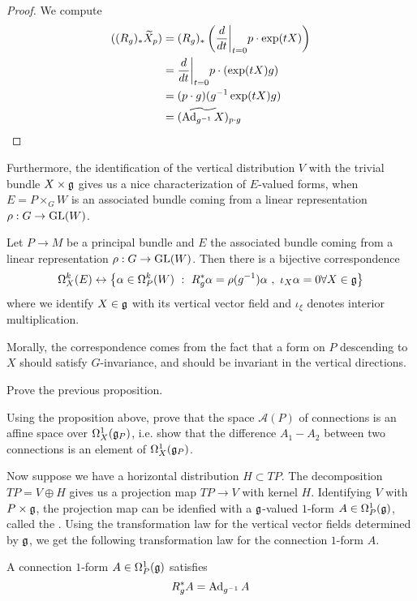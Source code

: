 %
\begin{proof}
We compute
\begin{align*}
((R_g)_*\widetilde{X}_p)
&= (R_g)_*\left(\frac{d}{dt}\bigg\vert_{t=0}p\cdot\exp(tX)\right) \\
&= \frac{d}{dt}\bigg\vert_{t=0}p\cdot(\exp(tX)g) \\
&= (p\cdot g)(g^{-1}\exp(tX)g) \\
&= (\widetilde{\operatorname{Ad}_{g^{-1}}X})_{p\cdot g}
\end{align*}
\end{proof}
%
Furthermore, the identification of the vertical distribution $V$ with the trivial
bundle $X \times \mathfrak{g}$ gives us a nice characterization of $E$-valued forms,
when $E = P\times_G W$ is an associated bundle coming from a linear representation
$\rho : G \to \mathrm{GL}(W)$.
%
\begin{prop}
Let $P \to M$ be a principal bundle and $E$ the associated bundle coming from
a linear representation $\rho : G \to \mathrm{GL}(W)$. Then there is a bijective
correspondence
\[
\Omega^k_X(E) \leftrightarrow \left\lbrace \alpha \in \Omega^k_P(W) ~:~ R^*_g\alpha =
\rho(g^{-1})\alpha~,~ \iota_X\alpha = 0 \forall X \in \mathfrak{g} \right\rbrace
\]
where we identify $X \in \mathfrak{g}$ with its vertical vector field and
$\iota_\xi$ denotes interior multiplication.
\end{prop}
%
Morally, the correspondence comes from the fact that a form on $P$ descending
to $X$ should satisfy $G$-invariance, and should be invariant in the vertical
directions.
%
\begin{exer}
Prove the previous proposition.
\end{exer}
%
\begin{exer}
Using the proposition above, prove that the space $\mathscr{A}(P)$ of connections
is an affine space over $\Omega^1_X(\mathfrak{g}_P)$, i.e. show that the difference
$A_1 - A_2$ between two connections is an element of $\Omega^1_X(\mathfrak{g}_P)$.
\end{exer}
%
Now suppose we have a horizontal distribution $H \subset TP$. The decomposition
$TP = V \oplus H$ gives us a projection map $TP \to V$ with kernel $H$.
Identifying $V$ with $P \times \mathfrak{g}$, the projection map can be idenfied with
a $\mathfrak{g}$-valued $1$-form $A \in \Omega^1_P(\mathfrak{g})$, called the
. Using the transformation law for the vertical
vector fields determined by $\mathfrak{g}$, we get the following transformation law
for the connection $1$-form $A$.
%
\begin{prop}
A connection $1$-form $A \in \Omega^1_P(\mathfrak{g})$ satisfies
\[
R^*_gA = \operatorname{Ad}_{g^{-1}}A
\]
\end{prop}
